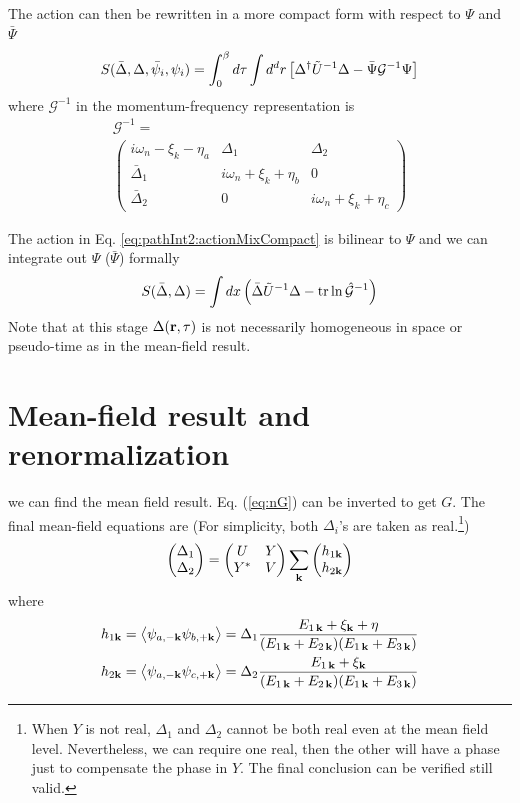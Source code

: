\documentclass[reprint,pra]{revtex4-1}
\begin{document}
The action can then be rewritten in a more compact form with respect to $\Psi$ and $\bar\Psi$
\begin{equation}\label{eq:pathInt2:actionMixCompact}
S(\bar\Delta,\Delta,\bar\psi_{i},\psi_{i})=\int^{\beta}_{0}d\tau\int{d^{d}r}
	\left[\Delta^{\dagger}\tilde{U}^{-1}\Delta-\bar\Psi\mathcal{G}^{-1}\Psi\right]
\end{equation}
where $\mathcal{G}^{-1}$ in the momentum-frequency representation is 
\begin{multline}\label{eq:nG}
\mathcal{G}^{-1}=\\
\begin{pmatrix}
i\omega_{n}-\xi_{k}-\eta_{a}&\Delta_{1}&\Delta_{2}\\
\bar\Delta_{1}&i\omega_{n}+\xi_{k}+\eta_{b}&0\\
\bar\Delta_{2}&0&i\omega_{n}+\xi_{k}+\eta_{c}
\end{pmatrix}
\end{multline}

The action in Eq. \ref{eq:pathInt2:actionMixCompact} is  bilinear to $\Psi$ and we can integrate  out $\Psi$ ($\bar\Psi$) formally
\begin{equation}\label{eq:pathInt2:actionD}
S(\bar{\Delta},\Delta)=\int{dx}\left(\bar{\Delta}\tilde{U}^{-1}\Delta-\text{tr}\ln\hat{\mathcal{G}}^{-1}\right)
\end{equation}
Note that at this stage $\Delta(\mathbf{r},\tau)$  is not necessarily homogeneous in space or pseudo-time as in the mean-field result.  


\section{Mean-field result and renormalization\label{sec:mean}}

we can find the mean field result. Eq. (\ref{eq:nG}) can be inverted to get $G$.   The final mean-field equations are (For simplicity,  both $\Delta_{i}$'s are taken as real.\footnote{\label{foot:pathInt2:real}When $Y$ is not real, $\Delta_{1}$ and $\Delta_{2}$ cannot be both real even at the mean field level.  Nevertheless, we can require one  real, then the other will have a phase just to compensate the phase in $Y$.  The final conclusion can be verified  still valid.   }) 
  \begin{equation}\label{eq:pathInt2:mf}
\begin{pmatrix}\Delta_1\\\Delta_2\end{pmatrix}=\begin{pmatrix}U&Y\\Y^{*}&V\end{pmatrix}\sum_{\mathbf{k}}\begin{pmatrix}h_{1\mathbf{k}}\\h_{2\mathbf{k}}\end{pmatrix}
\end{equation}
  where 
  \begin{gather}
  h_{1\mathbf{k}}=\bigl<{\psi_{a,-{\mathbf{k}}}\psi_{b,+{\mathbf{k}}}}\bigr>
  =\Delta_{1}\frac{E_{1\,\mathbf{k}}+\xi_{\mathbf{k}}+\eta}{(E_{1\,\mathbf{k}}+E_{2\,\mathbf{k}})(E_{1\,\mathbf{k}}+E_{3\,\mathbf{k}})}\label{eq:pathInt2:h1}\\
  h_{2\mathbf{k}}=\bigl<{\psi_{a,-{\mathbf{k}}}\psi_{c,+{\mathbf{k}}}}\bigr>
  =\Delta_{2}\frac{E_{1\,\mathbf{k}}+\xi_{\mathbf{k}}}{(E_{1\,\mathbf{k}}+E_{2\,\mathbf{k}})(E_{1\,\mathbf{k}}+E_{3\,\mathbf{k}})}\label{eq:pathInt2:h2}
  \end{gather}
  
\end{document}

